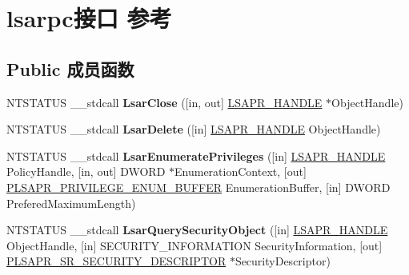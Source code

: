 \hypertarget{interfacelsarpc}{}\section{lsarpc接口 参考}
\label{interfacelsarpc}
\subsection*{Public 成员函数}
\begin{DoxyCompactItemize}
\item 
\mbox{\label{interfacelsarpc_a92fb095f16099e81f92c539c122d82fb}} 
N\+T\+S\+T\+A\+T\+US \+\_\+\+\_\+stdcall {\bfseries Lsar\+Close} (\mbox{[}in, out\mbox{]} \hyperlink{interfacevoid}{L\+S\+A\+P\+R\+\_\+\+H\+A\+N\+D\+LE} $\ast$Object\+Handle)
\item 
\mbox{\label{interfacelsarpc_a4b4de5484f0fe76efe8339e8e90e1129}} 
N\+T\+S\+T\+A\+T\+US \+\_\+\+\_\+stdcall {\bfseries Lsar\+Delete} (\mbox{[}in\mbox{]} \hyperlink{interfacevoid}{L\+S\+A\+P\+R\+\_\+\+H\+A\+N\+D\+LE} Object\+Handle)
\item 
\mbox{\label{interfacelsarpc_a30cfc0b3a71c15cb882c906e54c7de78}} 
N\+T\+S\+T\+A\+T\+US \+\_\+\+\_\+stdcall {\bfseries Lsar\+Enumerate\+Privileges} (\mbox{[}in\mbox{]} \hyperlink{interfacevoid}{L\+S\+A\+P\+R\+\_\+\+H\+A\+N\+D\+LE} Policy\+Handle, \mbox{[}in, out\mbox{]} D\+W\+O\+RD $\ast$Enumeration\+Context, \mbox{[}out\mbox{]} \hyperlink{struct___l_s_a_p_r___p_r_i_v_i_l_e_g_e___e_n_u_m___b_u_f_f_e_r}{P\+L\+S\+A\+P\+R\+\_\+\+P\+R\+I\+V\+I\+L\+E\+G\+E\+\_\+\+E\+N\+U\+M\+\_\+\+B\+U\+F\+F\+ER} Enumeration\+Buffer, \mbox{[}in\mbox{]} D\+W\+O\+RD Prefered\+Maximum\+Length)
\item 
\mbox{\label{interfacelsarpc_a5e26758cf11529f4475d1d6e0eb146ae}} 
N\+T\+S\+T\+A\+T\+US \+\_\+\+\_\+stdcall {\bfseries Lsar\+Query\+Security\+Object} (\mbox{[}in\mbox{]} \hyperlink{interfacevoid}{L\+S\+A\+P\+R\+\_\+\+H\+A\+N\+D\+LE} Object\+Handle, \mbox{[}in\mbox{]} S\+E\+C\+U\+R\+I\+T\+Y\+\_\+\+I\+N\+F\+O\+R\+M\+A\+T\+I\+ON Security\+Information, \mbox{[}out\mbox{]} \hyperlink{struct___l_s_a_p_r___s_r___s_e_c_u_r_i_t_y___d_e_s_c_r_i_p_t_o_r}{P\+L\+S\+A\+P\+R\+\_\+\+S\+R\+\_\+\+S\+E\+C\+U\+R\+I\+T\+Y\+\_\+\+D\+E\+S\+C\+R\+I\+P\+T\+OR} $\ast$Security\+Descriptor)
\item 

\end{DoxyCompactItemize}
